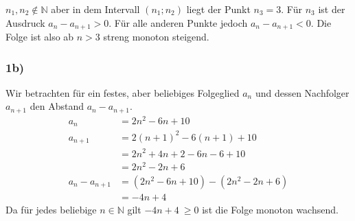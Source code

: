 $\displaystyle n_{1} ,n_{2} \notin \mathbb{N}$ aber in dem Intervall $\displaystyle ( n_{1} ;n_{2})$ liegt der Punkt $\displaystyle n_{3} =3$. Für $\displaystyle n_{3}$ ist der Ausdruck $\displaystyle a_{n} -a_{n+1}  >0$. Für alle anderen Punkte jedoch $\displaystyle a_{n} -a_{n+1} < 0$. Die Folge ist also ab $\displaystyle n >3$ streng monoton steigend. 

\subsubsection*{1b)}

Wir betrachten für ein festes, aber beliebiges Folgeglied $\displaystyle a_{n}$ und dessen Nachfolger $\displaystyle a_{n+1}$ den Abstand $\displaystyle a_{n} -a_{n+1}$.
\begin{align*}
  a_{n} & =2n^{2} -6n+10\\
  a_{n+1} & =2( n+1)^{2} -6( n+1) +10\\
  & =2n^{2} +4n+2-6n-6+10\\
  & =2n^{2} -2n+6\\
  a_{n} -a_{n+1} & =\left( 2n^{2} -6n+10\right) -\left( 2n^{2} -2n+6\right)\\
  & =-4n+4
\end{align*}
Da für jedes beliebige $\displaystyle n\in \mathbb{N}$ gilt $\displaystyle -4n+4\ \geq 0$ ist die Folge monoton wachsend.